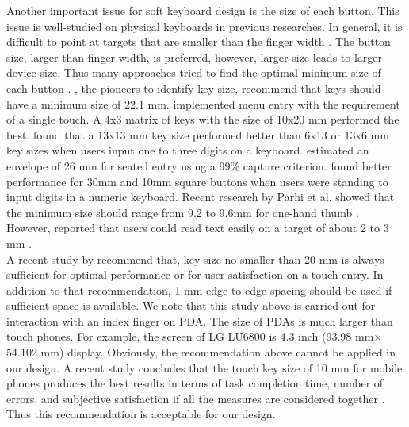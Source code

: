 \documentclass{singlecol-new}
\theoremstyle{TH}{
\newtheorem{lemma}{Lemma}
\newtheorem{theorem}[lemma]{Theorem}
\newtheorem{corrolary}[lemma]{Corrolary}
\newtheorem{conjecture}[lemma]{Conjecture}
\newtheorem{proposition}[lemma]{Proposition}
\newtheorem{claim}[lemma]{Claim}
\newtheorem{stheorem}[lemma]{Wrong Theorem}
\newtheorem{algorithm}{Algorithm}
}
\theoremstyle{THrm}{
\newtheorem{definition}{Definition}[section]
\newtheorem{question}{Question}[section]
\newtheorem{remark}{Remark}
\newtheorem{scheme}{Scheme}
}
\theoremstyle{THhit}{
\newtheorem{case}{Case}[section]
}
\begin{document}
Another important issue for soft keyboard design is the size of each button. This issue is well-studied on physical keyboards in previous researches. In general, it is difficult to point at targets that are smaller than the finger width \citep{albinsson2003high}. The button size, larger than finger width, is preferred, however, larger size leads to larger device size. Thus many approaches tried to find the optimal minimum size of each button \citep{beringer1990target, hall1988factors}. \citet{pfauth1981person}, the pioneers to identify key size, recommend that keys should have a minimum size of 22.1 mm. \citet{beaton1985effects} implemented menu entry with the requirement of a single touch. A 4x3 matrix of keys with the size of 10x20 mm performed the best. \citet{martin1988configuring}found that a 13x13 mm key size performed better than 6x13 or 13x6 mm key sizes when users input one to three digits on a keyboard. \citet{sears1991improving}estimated an envelope of 26 mm for seated entry using a 99\% capture criterion. \citet{bender1999touch} found better performance for 30mm and 10mm square buttons when users were standing to input digits in a numeric keyboard. Recent research by Parhi et al. showed that the minimum size should range from 9.2 to 9.6mm for one-hand thumb \citep{parhi2006target}. However, \citet{darroch2005effect} reported that users could read text easily on a target of about 2 to 3 mm .\\

A recent study by \citet{colle2004standing} recommend that, key size no smaller than 20 mm is always sufficient for optimal performance or for user satisfaction on a touch entry. In addition to that recommendation, 1 mm edge-to-edge spacing should be used if sufficient space is available. We note that this study above is carried out for interaction with an index finger on PDA. The size of PDAs is much larger than touch phones. For example, the screen of LG LU6800 is 4.3 inch (93.98 mm$\times$54.102 mm) display. Obviously, the recommendation above cannot be applied in our design. A recent study concludes that the touch key size of 10 mm for mobile phones produces the best results in terms of task completion time, number of errors, and subjective satisfaction if all the measures are considered together \citep{park2010touch}. Thus this recommendation is acceptable for our design.\\
\end{document}
